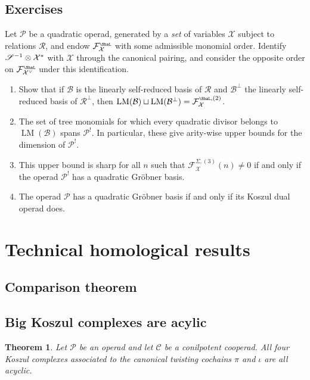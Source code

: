 \documentclass[fleqn, a4paper, twoside]{article}
\newcommand{\leadm}[1]{\operatorname{LM}(#1)}
\newcommand{\Sha}{{\scaleobj{0.75}{\ShaL}}}
\newcommand{\0}{\langle 0\rangle}
\newcommand{\XX}{\mathcal{X}}
\newcommand{\RR}{\mathcal{R}}
\newcommand{\FF}{\mathcal{F}}
\newenvironment{tenumerate}{
 \begin{enumerate}
  \setlength{\itemsep}{0pt}
  \setlength{\parskip}{0pt}
}{\end{enumerate}}
\DeclareRobustCommand{\[}{\begin{equation}}%
\DeclareRobustCommand{\]}{\end{equation}}%
\theoremstyle{mytheorem}
\newtheorem{theorem}{Theorem}[section]
\theoremstyle{introthm}
\theoremstyle{mydefinition}
\theoremstyle{mydefinition2}
\theoremstyle{plain} %
\newcommand{\CC}{\mathcal{C}}
\newcommand{\?}{\,?\,}
\newcommand{\PP}{{\mathcal{P}}}
\theoremstyle{mytheorem}
\theoremstyle{plain} %
\newcommand\blankpage{%
    \null
    \thispagestyle{empty}%
    \newpage}
\begin{document}
\subsection{Exercises}

\begin{question}\label{ex:quadratic-GB-dual} 
Let $\PP$ be a quadratic operad, generated by a \emph{set}
of variables $\XX$ subject to relations $\RR$, 
and endow $\FF_\XX^\Sha$ with some
admissible monomial order. Identify $\sus^{-1}\otimes \XX^*$
with $\XX$ through the canonical pairing, and consider
the opposite order on $\FF_{\XX^\vee}^\Sha$ 
under this identification.
\begin{tenumerate}
\item Show that if $\mathcal B$ is the linearly self-reduced
basis of $\RR$ and $\mathcal B^\perp$ the linearly self-reduced
basis of $\RR^\perp$, then $\leadm{\mathcal B}\sqcup
\leadm{\mathcal B^\perp} = \FF_\XX^{\Sha,(2)}$.
\item The set of tree monomials for which every quadratic divisor belongs to $\leadm{\mathcal B}$ spans $\PP^!$. In particular, these give
arity-wise upper bounds for the dimension of $\PP^!$.
\item This upper bound is sharp for all $n$ such that $\FF_\XX^{\Sigma,(3)}(n) \neq 0$ if and only if the operad $\PP^!$ has a quadratic 
Gr\"obner basis.
\item The operad  $\PP$ has a quadratic 
Gr\"obner basis if and only if its Koszul dual operad does. 
\end{tenumerate}
\end{question}
\newpage

\appendix

\section{Technical homological results}

\subsection{Comparison theorem}

\subsection{Big Koszul complexes are acylic}

\begin{theorem}\label{thm:augacyclic}
Let $\PP$ be an operad and let $\CC$ be a conilpotent cooperad. All four
Koszul complexes associated to the canonical twisting cochains
$\pi$ and $\iota$ are all acyclic. 
\end{theorem}
\end{document}
